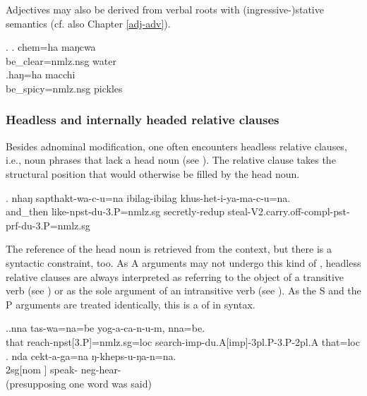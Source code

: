 Adjectives may also be derived from verbal roots with (ingressive-)stative semantics \Next (cf. also Chapter \ref{adj-adv}).


	  \ex. \ag.  chem=ha maŋcwa\\
	be\_clear{\sc =nmlz.nsg}  water\\
	\bg.haŋ=ha macchi\\
	be\_spicy{\sc =nmlz.nsg}	pickles\\

	
 

\subsubsection{Headless and internally headed relative clauses}\label{internally-headed-rc}
	
Besides  adnominal modification, one often encounters headless relative clauses, i.e., noun phrases that lack a head noun (see \Next). The relative clause takes the structural position that would otherwise be filled by the head noun.

\exg.  nhaŋ   sapthakt-wa-c-u=na                ibilag-ibilag       khus-het-i-ya-ma-c-u=na.\\
 and\_then like{\sc -npst-du-3.P=nmlz.sg} secretly-{\sc redup} steal{\sc -V2.carry.off-compl-pst-prf-du-3.P=nmlz.sg}\\
 


The reference of the head noun is retrieved from the context, but there is a syntactic constraint, too.
As A arguments may not undergo this kind of , headless relative clauses are always interpreted as referring to the object of a transitive verb (see \Next[a]) or as the sole argument of an intransitive verb (see \Next[b]). As the S and the P arguments are treated identically, this is a  of   in syntax.

\ex.\ag.nna  tas-wa=na=be  yog-a-ca-n-u-m, nna=be.\\
	that reach{\sc [3sg.A]-npst[3.P]=nmlz.sg=loc} search{\sc -imp-du.A[imp]-3pl.P-3.P-2pl.A}	that{\sc =loc}	\\
	\bg. nda  cekt-a-ga=na ŋ-kheps-u-ŋa-n=na.\\
{\sc 2sg[nom ]} speak- {\sc neg}-hear-\\
  (presupposing one word was said)


